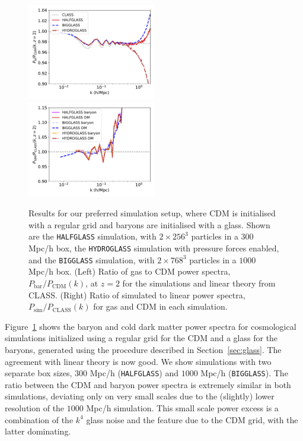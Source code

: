\documentclass[a4paper,11pt]{article}
\begin{document}
\begin{figure}
\includegraphics[width=0.5\textwidth]{plots/halfglass_2_relpower.pdf}
  \includegraphics[width=0.5\textwidth]{plots/halfglass_2_class.pdf}
\caption{Results for our preferred simulation setup, where CDM is initialised with a regular grid and baryons are initialised with a glass. Shown are the \texttt{HALFGLASS} simulation, with $2\times 256^3$ particles in a $300$ Mpc/h box, the \texttt{HYDROGLASS} simulation with pressure forces enabled, and the \texttt{BIGGLASS} simulation, with $2\times 768^3$ particles in a $1000$ Mpc/h box. (Left) Ratio of gas to CDM power spectra, $P_\mathrm{bar}/P_\mathrm{CDM}(k)$, at $z=2$ for the simulations and linear theory from CLASS. (Right) Ratio of simulated to linear power spectra, $P_\mathrm{sim}/P_\mathrm{CLASS}(k)$ for gas and CDM in each simulation.}
  \label{fig:baryonglass}
\end{figure}

Figure~\ref{fig:baryonglass} shows the baryon and cold dark matter power spectra for cosmological simulations initialized using a regular grid for the CDM and a glass for the baryons, generated using the procedure described in Section~\ref{sec:glass}. The agreement with linear theory is now good. We show simulations with two separate box sizes, $300$ Mpc/h (\texttt{HALFGLASS}) and $1000$ Mpc/h (\texttt{BIGGLASS}). The ratio between the CDM and baryon power spectra is extremely similar in both simulations, deviating only on very small scales due to the (slightly) lower resolution of the $1000$ Mpc/h simulation. This small scale power excess is a combination of the $k^4$ glass noise and the feature due to the CDM grid, with the latter dominating.
\end{document}
